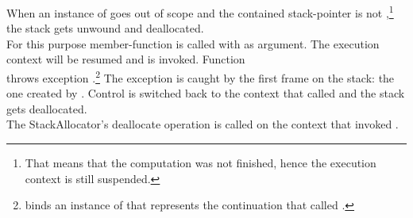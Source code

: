 
When an instance of \cont goes out of scope and the contained stack-pointer is
not \nullptr,\footnote{That means that the computation was not finished, hence
the execution context is still suspended.} the stack gets
unwound and deallocated.\\
For this purpose member-function \resumewith is called with \termthen
as argument. The execution context will be
resumed and \termthen is invoked. Function\\
\termthen throws exception
\unwindex.\footnote{\unwindex binds an instance of \cont that represents the
continuation that called \resumewith.} The exception
is caught by the first frame on the stack: the one created by
\callcc. Control is switched back to the context that called
\dtor and the stack gets deallocated.\\

The StackAllocator's deallocate operation is called on the context that
invoked \dtor.

